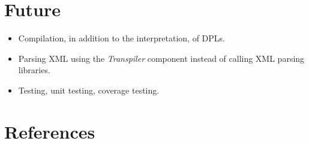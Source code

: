 \documentclass[10pt,anonymous,review]{acmart}
\begin{document}
\section{Future}
\begin{itemize}
\item Compilation, in addition to the interpretation, of DPLs.

\item Parsing XML using the \emph{Transpiler} component instead of calling XML parsing libraries.

\item Testing, unit testing, coverage testing.

\end{itemize}

\section{References}
\end{document}
